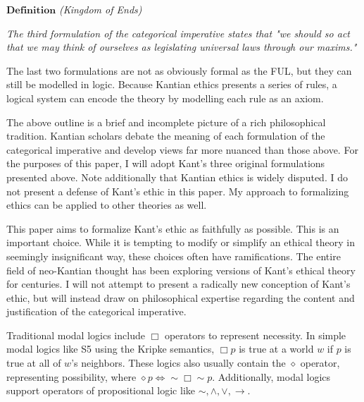 \begin{isabellebody}
\begin{isamarkuptext}
\medskip 

$\textbf{Definition}$ \emph{(Kingdom of Ends)}

\emph{The third formulation of the categorical imperative states that "we should so act that we may 
think of ourselves as legislating universal laws through our maxims."}\cite{KorsgaardFUL}

The last two formulations are not as obviously formal as the FUL, but they can still be
modelled in logic. Because Kantian ethics presents a series of rules, a logical system can encode 
the theory by modelling each rule as an axiom.

The above outline is a brief and incomplete picture of a rich philosophical tradition. Kantian scholars
debate the meaning of each formulation of the categorical imperative and develop views far more 
nuanced than those above. For the purposes of this paper, I will adopt Kant's three original 
formulations presented above. Note additionally that Kantian ethics is widely disputed. I do not present 
a defense of Kant's ethic in this paper. My approach to formalizing ethics can be applied to other 
theories as well.  

This paper aims to formalize Kant's ethic as faithfully as possible. This is an important choice. 
While it is tempting to modify or simplify an ethical theory in seemingly insignificant way, these 
choices often have ramifications. The entire field of neo-Kantian thought 
has been exploring versions of Kant's ethical theory for centuries. I will not attempt to present a 
radically new conception of Kant's ethic, but will instead draw on philosophical expertise regarding
the content and justification of the categorical imperative.%
\end{isamarkuptext}\isamarkuptrue%
%
\isadelimdocument
%
\endisadelimdocument
%
\isatagdocument
%
\isamarkuptrue%
%
\isamarkuptrue%
%
\endisatagdocument
{\isafolddocument}%
%
\isadelimdocument
%
\endisadelimdocument
%
\begin{isamarkuptext}%
Traditional modal logics include $\Box$ operators to represent necessity. In simple modal logics like S5 \cite{cresswell} 
using the Kripke semantics, $\Box p$ is true at a world $w$ if $p$ is true at all of $w$'s neighbors. 
These logics also usually contain the $\diamond$ operator, representing possibility, where
 $\diamond p \iff \sim \Box \sim p$. Additionally, modal logics support operators of propositional 
logic like $\sim, \wedge, \vee, \rightarrow$.


\end{isamarkuptext}
\end{isabellebody}
